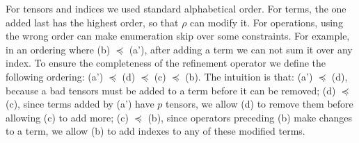 \documentclass{article}
\renewcommand\[{\begin{equation}}
\renewcommand\]{\end{equation}}
\begin{document}
For tensors and indices we used standard alphabetical order.  For terms, the
one added last has the highest order, so that $\rho$ can modify it.
For operations, using the wrong order can make enumeration skip over some
constraints.  For example, in an ordering where (b) $\preceq$ (a'), after
adding a term we can not sum it over any index.  To ensure the completeness of
the refinement operator we define the following ordering: (a') $\preceq$ (d)
$\preceq$ (c) $\preceq$ (b).  The intuition is that:
%
(a') $\preceq$ (d), because a bad tensors must be added to a term before it can
be removed;
%
(d) $\preceq$ (c), since terms added by (a') have $p$ tensors, we
allow (d) to remove them before allowing (c) to add more;
%
(c) $\preceq$ (b), since operators preceding (b) make changes to a term, we
allow (b) to add indexes to any of these modified terms.
\end{document}
